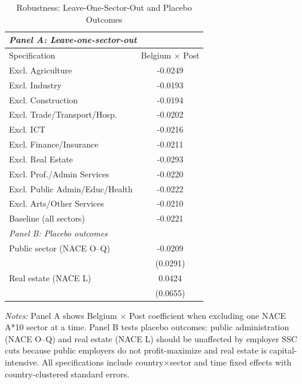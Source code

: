 \begin{table}[H]
\centering
\caption{Robustness: Leave-One-Sector-Out and Placebo Outcomes}
\begin{threeparttable}
\begin{tabular}{lc}
\toprule
\multicolumn{2}{l}{\textit{Panel A: Leave-one-sector-out}} \\
\midrule
Specification & Belgium $\times$ Post \\
\midrule
Excl. Agriculture & -0.0249 \\
Excl. Industry & -0.0193 \\
Excl. Construction & -0.0194 \\
Excl. Trade/Transport/Hosp. & -0.0202 \\
Excl. ICT & -0.0216 \\
Excl. Finance/Insurance & -0.0211 \\
Excl. Real Estate & -0.0293 \\
Excl. Prof./Admin Services & -0.0220 \\
Excl. Public Admin/Educ/Health & -0.0222 \\
Excl. Arts/Other Services & -0.0210 \\
\midrule
Baseline (all sectors) & -0.0221 \\
\midrule
\multicolumn{2}{l}{\textit{Panel B: Placebo outcomes}} \\
\midrule
Public sector (NACE O--Q) & -0.0209 \\
 & (0.0291) \\
Real estate (NACE L) & 0.0424 \\
 & (0.0655) \\
\bottomrule
\end{tabular}
\begin{tablenotes}[flushleft]
\small
\item \textit{Notes:} Panel A shows Belgium $\times$ Post coefficient when excluding one NACE A*10 sector at a time. Panel B tests placebo outcomes: public administration (NACE O--Q) and real estate (NACE L) should be unaffected by employer SSC cuts because public employers do not profit-maximize and real estate is capital-intensive. All specifications include country$\times$sector and time fixed effects with country-clustered standard errors.
\end{tablenotes}
\end{threeparttable}
\label{tab:robustness}
\end{table}
